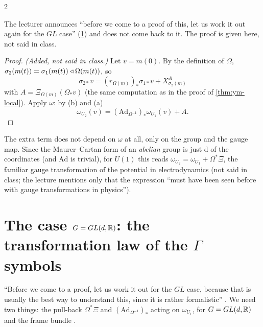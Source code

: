 \begin{paracol}{2}
\begin{coursenote}
The lecturer announces ``before we come to a proof of this, let us work it out again for the $GL$ case'' (\cref{sec:ym-gl}) and does not come back to it. The proof is given here, not said in class. 
\end{coursenote}
\begin{proof}
\emph{(Added, not said in class.)} Let $v=\dot m(0)$. By the definition of $\Omega$, $\sigma_2(m(t))=\sigma_1(m(t))\mathbin{\triangleleft}\Omega(m(t))$, so
\[
  \sigma_{2*}v=(r_{\Omega(m)})_*\sigma_{1*}v+X^{A}_{\sigma_2(m)}
\]
with $A=\Xi_{\Omega(m)}(\Omega_*v)$ (the same computation as in the proof of \cref{thm:ym-local}). Apply $\omega$: by (b) and (a)
\[
  \omega_{U_2}(v)=(\mathrm{Ad}_{\Omega^{-1}})_*\omega_{U_1}(v)+A .
\]
\end{proof}
The extra term does not depend on $\omega$ at all, only on the group and the gauge map. Since the Maurer--Cartan form of an \emph{abelian} group is just $\mathrm d$ of the coordinates (and $\mathrm{Ad}$ is trivial), for $U(1)$ this reads $\omega_{U_2}=\omega_{U_1}+\Omega^*\Xi$, the familiar gauge transformation of the potential in electrodynamics (not said in class; the lecture mentions only that the expression ``must have been seen before with gauge transformations in physics'').

\section{The case $G=GL(d,\mathbb{R})$: the transformation law of the $\Gamma$ symbols}\label{sec:ym-gl}

``Before we come to a proof, let us work it out for the $GL$ case, because that is usually the best way to understand this, since it is rather formalistic''  . We need two things: the pull-back $\Omega^*\Xi$ and $(\mathrm{Ad}_{\Omega^{-1}})_*$ acting on $\omega_{U_1}$, for $G=GL(d,\mathbb{R})$ and the frame bundle  .


\end{paracol}
